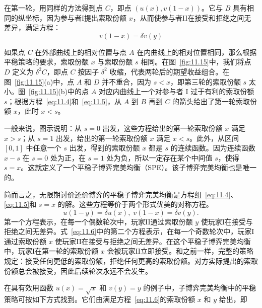 在第一轮，用同样的方法得到点 \(C\)，即点 \(\left( {u\left( x\right),v\left( {1 - x}\right) }\right)\)。它与 \(B\) 具有相同的纵坐标，因为参与者I提出索取份额 \(x\)，从而使参与者II在接受和拒绝之间无差异，满足方程：
\begin{equation}
\label{eq:11.5}
v\left( {1 - x}\right)  = {\delta v}\left( y\right)
\end{equation}

如果点 \(C\) 在外部曲线上的相对位置与点 \(A\) 在内曲线上的相对位置相同，那么根据平稳策略的要求，索取份额 \(x\) 与索取份额 \(s\) 相同。在图~\ref{fig:11.15}中，我们将点 \(D\) 定义为 \({\delta }^{2}C\)，即点 \(C\) 按因子 \({\delta }^{2}\) 收缩，代表两轮后的期望收益组合。在图~\ref{fig:11.15}(a)中，点 \(A\) 和 \(D\) 并不重合，因为 \(s < x\)，即第三轮的索取份额 \(s\) 太小。图~\ref{fig:11.15}(b)中的点 \(A\) 对应内曲线上一个对参与者 \(\mathrm{I}\) 过于有利的索取份额 \(s\)；根据方程~\eqref{eq:11.4}和~\eqref{eq:11.5}，从 \(A\) 到 \(B\) 再到 \(C\) 的箭头给出了第一轮索取份额 \(x\)，此时 \(x < s\)。

一般来说，图示说明：从 \(s = 0\) 出发，这些方程给出的第一轮索取份额 \(x\) 满足 \(x > s\)；从 \(s = 1\) 出发，给出的第一轮索取份额 \(x\) 满足 \(x < s\)。此外，从区间 \(\left\lbrack  {0,1}\right\rbrack\) 中任意一个 \(s\) 出发，得到的索取份额 \(x\) 都是 \(s\) 的连续函数。因为连续函数 \(x - s\) 在 \(s = 0\) 处为正，在 \(s = 1\) 处为负，所以一定存在某个中间值 \(s\)，使得 \(s = x\)。这就定义了一个平稳子博弈完美均衡（SPE）。该子博弈完美均衡也是唯一的\citep[见][Theorem~5.8.4]{binmore1992}。

简而言之，无限期讨价还价博弈的平稳子博弈完美均衡是方程组~\eqref{eq:11.4}、\eqref{eq:11.5}和 \(s = x\) 的解。这些方程等价于两个形式优美的对称方程。
\begin{equation}
\label{eq:11.6}
u\left( {1 - y}\right)  = {\delta u}\left( x\right) ,\;v\left( {1 - x}\right)  = {\delta v}\left( y\right).
\end{equation}
第一个方程表示，在每一个偶数轮次中，玩家II通过索取份额 \(y\) 使玩家I在接受与拒绝之间无差异。式~\eqref{eq:11.6}中的第二个方程表示，在每一个奇数轮次中，玩家I通过索取份额 \(x\) 使玩家II在接受与拒绝之间无差异。在这个平稳子博弈完美均衡中，玩家I在第一轮的索取份额 \(x\) 会被玩家II立即接受。和之前一样，完整的策略规定：接受任何更低的索取份额，拒绝任何更高的索取份额。对方实际提出的索取份额总会被接受，因此后续轮次永远不会发生。

在具有效用函数 \(u\left( x\right)  = \sqrt{x}\) 和 \(v\left( y\right)  = y\) 的例子中，子博弈完美均衡中的平稳策略可按如下方式找到。它们由满足方程~\eqref{eq:11.6}的索取份额 \(x\) 和 \(y\) 给出，即

